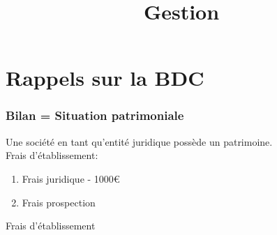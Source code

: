 \documentclass[10pt,a4paper]{article}
\title{Gestion}
\date{}
\begin{document}
	\part{Rappels sur la BDC}
	\section{Bilan = Situation patrimoniale}
	
	Une société en tant qu'entité juridique possède un patrimoine.\\

	Frais d'établissement:
	\begin{enumerate}
	\item Frais juridique - 1000€
	\item Frais prospection 
	\end{enumerate}
	Frais d'établissement
\end{document}
